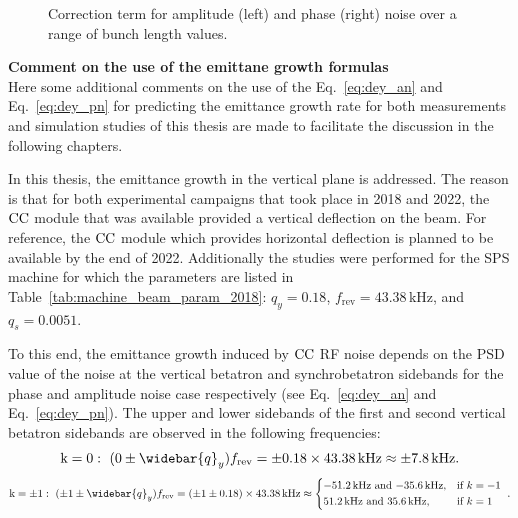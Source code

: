 \begin{figure}[!ht]
\begin{subfigure}[t]{0.45\textwidth}
    \end{subfigure}
    \hfill
     \caption{Correction term for amplitude (left) and phase (right) noise over a range of bunch length values.} %
     \label{fig:correction_term_bunch_length}
 \end{figure}

\textbf{Comment on the use of the emittane growth formulas}\\
Here some additional comments on the use of the Eq.~\eqref{eq:dey_an} and Eq.~\eqref{eq:dey_pn} for predicting the emittance growth rate for both measurements and simulation studies of this thesis are made to facilitate the discussion in the following chapters.

In this thesis, the emittance growth in the vertical plane is addressed. The reason is that for both experimental campaigns that took place in 2018 and 2022, the ${\mathrm{CC}}$ module that was available provided a vertical deflection on the beam. For reference, the ${\mathrm{CC}}$ module which provides horizontal deflection is planned to be available by the end of 2022. Additionally the studies were performed for the SPS machine for which the parameters are listed in Table~\ref{tab:machine_beam_param_2018}: $q_y=0.18$, $f_\mathrm{rev}=43.38$\,kHz, and $q_s=0.0051$. 

To this end, the emittance growth induced by ${\mathrm{CC}}$ RF noise depends on the PSD value of the noise at the vertical betatron and synchrobetatron sidebands for the phase and amplitude noise case respectively (see Eq.~\eqref{eq:dey_an} and Eq.~\eqref{eq:dey_pn}). The upper and lower sidebands of the first and second vertical betatron sidebands are observed in the following frequencies:
\begin{equation}\label{eq:betatron_sideband_1}
    \mathrm{k=0}: \ (0 \pm \widebar{q}_y) f_\mathrm{rev} = \pm 0.18 \times 43.38\mathrm{\,kHz} \approx \pm 7.8\mathrm{\,kHz}.
\end{equation}
\begin{equation}\label{eq:betatron_sideband_2}
    \mathrm{k= \pm 1}: \ (\pm 1 \pm \widebar{q}_y) f_\mathrm{rev} = (\pm 1 \pm 0.18) \times 43.38\mathrm{\,kHz} \approx \begin{dcases*} 
        \text{$-$51.2\,kHz and $-$35.6\,kHz,} & if  $k=-1$ \\ 
        \text{51.2\,kHz and 35.6\,kHz,} & if  $k=1$  
        \end{dcases*} .
\end{equation}

